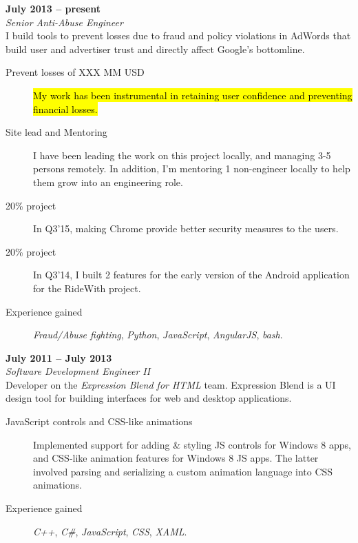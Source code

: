 \documentclass[margin,line]{resume}
\begin{document}
\begin{resume}
	 \hfill \textbf{July 2013 -- present}\\%
	\textsl{Senior Anti-Abuse Engineer}\\
    I build tools to prevent losses due to fraud and policy violations in AdWords that build user and advertiser trust and directly affect Google's bottomline.
	\begin{description}
	\item [Prevent losses of XXX MM USD] \hl{My work has been instrumental in retaining user confidence and preventing financial losses.}
	\item [Site lead and Mentoring] I have been leading the work on this project locally, and managing 3-5 persons remotely. In addition, I'm mentoring 1 non-engineer locally to help them grow into an engineering role.
	\item [20\% project] In Q3'15, making Chrome provide better security measures to the users. 
	\item [20\% project] In Q3'14, I built 2 features for the early version of the Android application for the RideWith project.
	\item [Experience gained] \textit{Fraud/Abuse fighting}, \textit{Python}, \textit{JavaScript}, \textit{AngularJS}, \textit{bash}.
    \end{description}

     \hfill \textbf{July 2011 -- July 2013}\\%
	\textsl{Software Development Engineer II}\\
	Developer on the \textit{Expression Blend for HTML} team. Expression Blend is a UI design tool for building interfaces for web and desktop applications.
	\begin{description}
	\item [JavaScript controls and CSS-like animations] Implemented support for adding \& styling JS controls for Windows 8 apps, and CSS-like animation features for Windows 8 JS apps. The latter involved parsing and serializing a custom animation language into CSS animations.
	\item [Experience gained] \textit{C++}, \textit{C\#}, \textit{JavaScript}, \textit{CSS}, \textit{XAML}.
    \end{description}


\end{resume}
\end{document}
